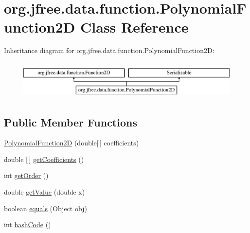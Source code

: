 \hypertarget{classorg_1_1jfree_1_1data_1_1function_1_1_polynomial_function2_d}{}\section{org.\+jfree.\+data.\+function.\+Polynomial\+Function2D Class Reference}
\label{classorg_1_1jfree_1_1data_1_1function_1_1_polynomial_function2_d}
Inheritance diagram for org.\+jfree.\+data.\+function.\+Polynomial\+Function2D\+:\begin{figure}[H]
\begin{center}
\leavevmode
\includegraphics[height=2.000000cm]{classorg_1_1jfree_1_1data_1_1function_1_1_polynomial_function2_d}
\end{center}
\end{figure}
\subsection*{Public Member Functions}
\begin{DoxyCompactItemize}
\item 
\mbox{\hyperlink{classorg_1_1jfree_1_1data_1_1function_1_1_polynomial_function2_d_a8a04cd83facaa62905a6945392eed333}{Polynomial\+Function2D}} (double\mbox{[}$\,$\mbox{]} coefficients)
\item 
double \mbox{[}$\,$\mbox{]} \mbox{\hyperlink{classorg_1_1jfree_1_1data_1_1function_1_1_polynomial_function2_d_ae6066b44c09588d96910269c3eb16b64}{get\+Coefficients}} ()
\item 
int \mbox{\hyperlink{classorg_1_1jfree_1_1data_1_1function_1_1_polynomial_function2_d_aa4c10c9436b2390c462b82393bf44493}{get\+Order}} ()
\item 
double \mbox{\hyperlink{classorg_1_1jfree_1_1data_1_1function_1_1_polynomial_function2_d_a636f8ebc39c8d62299e4a8d5a5325c14}{get\+Value}} (double x)
\item 
boolean \mbox{\hyperlink{classorg_1_1jfree_1_1data_1_1function_1_1_polynomial_function2_d_a1a6d629379d32a9f653a8d2a72bea25c}{equals}} (Object obj)
\item 
int \mbox{\hyperlink{classorg_1_1jfree_1_1data_1_1function_1_1_polynomial_function2_d_a328ffb36a5eb706c784752675e837f04}{hash\+Code}} ()
\end{DoxyCompactItemize}


